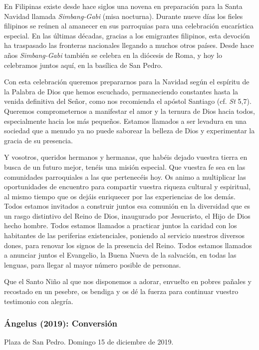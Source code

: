 En Filipinas existe desde hace siglos una novena en preparación para la Santa Navidad llamada \emph{Simbang-Gabi} (misa nocturna). Durante nueve días los fieles filipinos se reúnen al amanecer en sus parroquias para una celebración eucarística especial. En las últimas décadas, gracias a los emigrantes filipinos, esta devoción ha traspasado las fronteras nacionales llegando a muchos otros países. Desde hace años \emph{Simbang-Gabi} también se celebra en la diócesis de Roma, y hoy lo celebramos juntos aquí, en la basílica de San Pedro.

Con esta celebración queremos prepararnos para la Navidad según el espíritu de la Palabra de Dios que hemos escuchado, permaneciendo constantes hasta la venida definitiva del Señor, como nos recomienda el apóstol Santiago (cf. \emph{St} 5,7). Queremos comprometernos a manifestar el amor y la ternura de Dios hacia todos, especialmente hacia los más pequeños. Estamos llamados a ser levadura en una sociedad que a menudo ya no puede saborear la belleza de Dios y experimentar la gracia de su presencia.

Y vosotros, queridos hermanos y hermanas, que habéis dejado vuestra tierra en busca de un futuro mejor, tenéis una misión especial. Que vuestra fe sea  en las comunidades parroquiales a las que pertenecéis hoy. Os animo a multiplicar las oportunidades de encuentro para compartir vuestra riqueza cultural y espiritual, al mismo tiempo que os dejáis enriquecer por las experiencias de los demás. Todos estamos invitados a construir juntos esa comunión en la diversidad que es un rasgo distintivo del Reino de Dios, inaugurado por Jesucristo, el Hijo de Dios hecho hombre. Todos estamos llamados a practicar juntos la caridad con los habitantes de las periferias existenciales, poniendo al servicio nuestros diversos dones, para renovar los signos de la presencia del Reino. Todos estamos llamados a anunciar juntos el Evangelio, la Buena Nueva de la salvación, en todas las lenguas, para llegar al mayor número posible de personas.

Que el Santo Niño al que nos disponemos a adorar, envuelto en pobres pañales y recostado en un pesebre, os bendiga y os dé la fuerza para continuar vuestro testimonio con alegría.


\subsubsection{Ángelus (2019): Conversión}

Plaza de San Pedro. Domingo 15 de diciembre de 2019.

